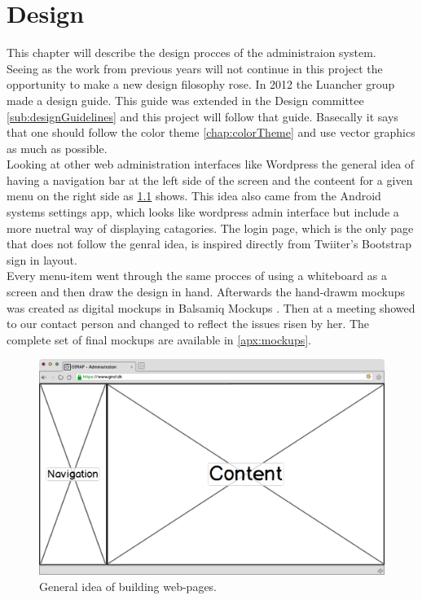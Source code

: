 \chapter{Design}
\label{chp:design}
This chapter will describe the design procces of the administraion system.\\
Seeing as the work from previous years will not continue in this project the opportunity to make a new design filosophy rose. 
In 2012 the Luancher group made a design guide. This guide was extended in the Design committee \ref{sub:designGuidelines} and this project will follow that guide. Basecally it says that one should follow the color theme \ref{chap:colorTheme} and use vector graphics as much as possible. \\
Looking at other web administration interfaces like Wordpress the general idea of having a navigation bar at the left side of the screen and the conteent for a given menu on the right side as \ref{fig:ideaWep} shows. This idea also came from the Android systems settings app, which looks like wordpress admin interface but include a more nuetral way of displaying catagories. The login page, which is the only page that does not follow the genral idea, is inspired directly from Twiiter's  Bootstrap sign in layout.\\ 
Every menu-item went through the same procces of using a whiteboard as a screen and then draw the design in hand. Afterwards the hand-drawm mockups was  created as digital mockups in Balsamiq Mockups . Then at a meeting showed to our contact person and changed to reflect the issues risen by her. The complete set of final mockups are available in \ref{apx:mockups}.\\

\begin{figure}[!h]
\centering
\includegraphics[width=1\textwidth]{images/mockup/displayMode.png}
\caption{General idea of building web-pages.}
\label{fig:ideaWep}
\end{figure}


